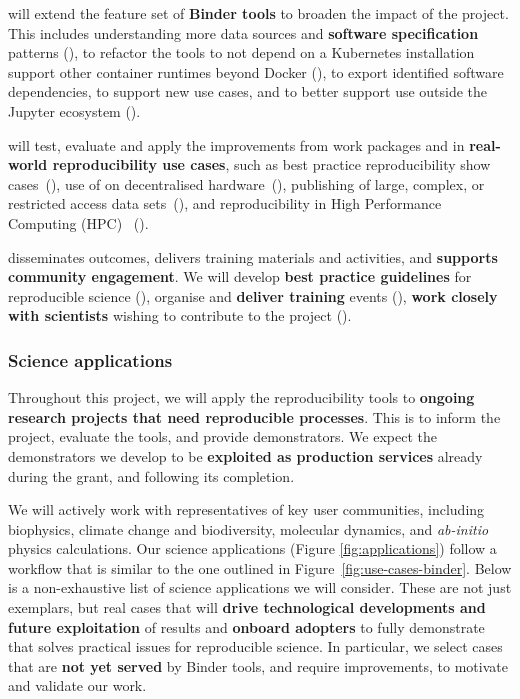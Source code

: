  will extend the feature set of \textbf{Binder tools} to broaden
the impact of the project. This
includes understanding more data sources and \textbf{software specification} patterns
(), to refactor the tools to not depend on a
Kubernetes installation support other container runtimes beyond Docker
(), to export identified software dependencies,
to support new use cases, and to
better support use outside the Jupyter ecosystem ().

 will test, evaluate and apply the improvements from
work packages  and  in \textbf{real-world
reproducibility use cases}, such as best practice reproducibility show
cases~(), use of \repotodocker{} on
decentralised hardware~(), publishing
of large, complex, or restricted access data
sets~(), and reproducibility in High Performance Computing (HPC)~
().

 disseminates outcomes, delivers training materials
and activities, and \textbf{supports community engagement}. We will develop \textbf{best practice guidelines} for reproducible
science (), organise and \textbf{deliver
training} events (), \textbf{work closely with
scientists} wishing to contribute to the project ().

\subsubsection{Science applications}\label{sec:science-applications}

Throughout this project, we will apply the reproducibility tools to \textbf{ongoing
research projects that need reproducible processes}. This is to inform the
project, evaluate the tools, and provide demonstrators. We expect the
demonstrators we develop to be \textbf{exploited as production services} already during
the grant, and following its completion.

We will actively work with representatives of key user communities, including biophysics,
climate change and biodiversity, molecular dynamics, and \emph{ab-initio} physics calculations.
Our science applications (Figure \ref{fig:applications}) follow a workflow that is similar to the one
outlined in Figure~\ref{fig:use-cases-binder}.
Below is a non-exhaustive list of science applications we will consider. These are not just exemplars, but
real cases that will \textbf{drive technological developments and future exploitation} of \TheProject results
 and \textbf{onboard adopters} to fully demonstrate that \TheProject
solves practical issues for reproducible science.
In particular, we select cases that are \textbf{not yet served} by Binder tools,
and require improvements,
to motivate and validate our work.

